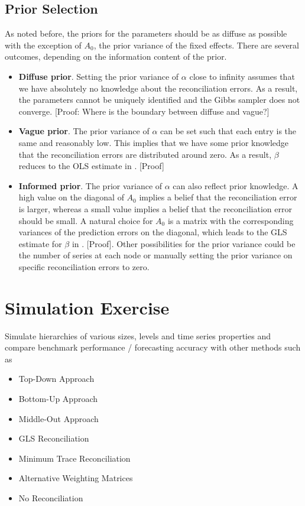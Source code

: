 \documentclass[a4paper,fleqn,11pt]{article}
\begin{document}
\subsection{Prior Selection}
As noted before, the priors for the parameters should be as diffuse as possible with the exception of $A_0$, the prior variance of the fixed effects. There are several outcomes, depending on the information content of the prior.
\begin{itemize}
    \item\textbf{Diffuse prior}. Setting the prior variance of $\alpha$ close to infinity assumes that we have absolutely no knowledge about the reconciliation errors. As a result, the parameters cannot be uniquely identified and the Gibbs sampler does not converge. [Proof: Where is the boundary between diffuse and vague?]
    \item \textbf{Vague prior}. The prior variance of $\alpha$ can be set such that each entry is the same and reasonably low. This implies that we have some prior knowledge that the reconciliation errors are distributed around zero. As a result, $\beta$ reduces to the OLS estimate in \cite{Hyndman2011}. [Proof]
    \item \textbf{Informed prior}. The prior variance of $\alpha$ can also reflect prior knowledge. A high value on the diagonal of $A_0$ implies a belief that the reconciliation error is larger, whereas a small value implies a belief that the reconciliation error should be small. A natural choice for $A_0$ is a matrix with the corresponding variances of the prediction errors on the diagonal, which leads to the GLS estimate for $\beta$ in \cite{Hyndman2016}. [Proof]. Other possibilities for the prior variance could be the number of series at each node or manually setting the prior variance on specific reconciliation errors to zero. 
\end{itemize}

\clearpage

\section{Simulation Exercise}

Simulate hierarchies of various sizes, levels and time series properties and compare benchmark performance / forecasting accuracy with other methods such as
\begin{itemize}
    \item Top-Down Approach
    \item Bottom-Up Approach
    \item Middle-Out Approach
    \item GLS Reconciliation \cite{Hyndman2011}
    \item Minimum Trace Reconciliation \cite{Wickramasuriya2015}
    \item Alternative Weighting Matrices
    \item No Reconciliation\\
\end{itemize}
\end{document}
